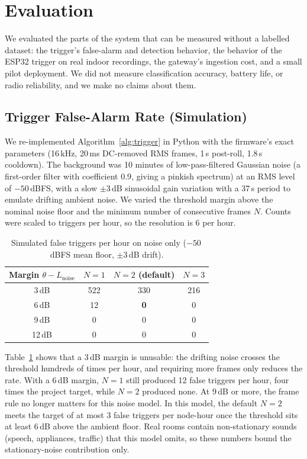 \documentclass[conference]{IEEEtran}
\newcommand{\dBFS}{\,dBFS}
\newcommand{\ms}{\,ms}
\begin{document}
\section{Evaluation}
\label{sec:eval}

We evaluated the parts of the system that can be measured without a labelled dataset: the trigger's false-alarm and detection behavior, the behavior of the ESP32 trigger on real indoor recordings, the gateway's ingestion cost, and a small pilot deployment. We did not measure classification accuracy, battery life, or radio reliability, and we make no claims about them.

\subsection{Trigger False-Alarm Rate (Simulation)}
\label{sec:fa}
We re-implemented Algorithm~\ref{alg:trigger} in Python with the firmware's exact parameters (16\,kHz, 20\ms{} DC-removed RMS frames, 1\,s post-roll, 1.8\,s cooldown). The background was 10 minutes of low-pass-filtered Gaussian noise (a first-order filter with coefficient 0.9, giving a pinkish spectrum) at an RMS level of $-50$\dBFS, with a slow $\pm 3$\,dB sinusoidal gain variation with a 37\,s period to emulate drifting ambient noise. We varied the threshold margin above the nominal noise floor and the minimum number of consecutive frames $N$. Counts were scaled to triggers per hour, so the resolution is 6 per hour.

\begin{table}[!t]
\centering
\caption{Simulated false triggers per hour on noise only ($-50$\dBFS{} mean floor, $\pm3$\,dB drift).}
\label{tab:fa}
\renewcommand{\arraystretch}{1.1}
\begin{tabular}{@{}c c c c@{}}
\toprule
\textbf{Margin $\theta - L_{\text{noise}}$} & $N=1$ & $N=2$ (default) & $N=3$ \\
\midrule
3\,dB & 522 & 330 & 216 \\
6\,dB & 12 & \textbf{0} & 0 \\
9\,dB & 0 & 0 & 0 \\
12\,dB & 0 & 0 & 0 \\
\bottomrule
\end{tabular}
\end{table}

Table~\ref{tab:fa} shows that a 3\,dB margin is unusable: the drifting noise crosses the threshold hundreds of times per hour, and requiring more frames only reduces the rate. With a 6\,dB margin, $N=1$ still produced 12 false triggers per hour, four times the project target, while $N=2$ produced none. At 9\,dB or more, the frame rule no longer matters for this noise model. In this model, the default $N=2$ meets the target of at most 3 false triggers per node-hour once the threshold sits at least 6\,dB above the ambient floor. Real rooms contain non-stationary sounds (speech, appliances, traffic) that this model omits, so these numbers bound the stationary-noise contribution only.
\end{document}

